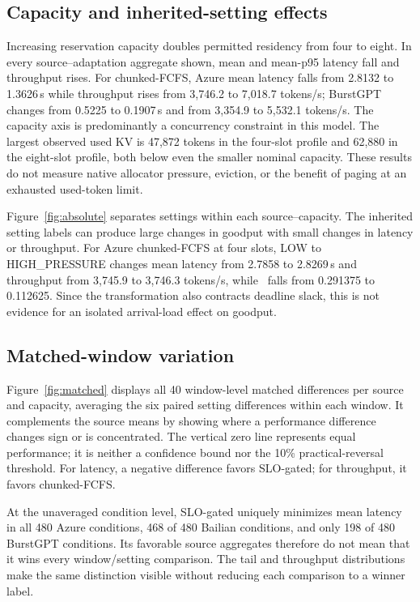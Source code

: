\FloatBarrier


\subsection{Capacity and inherited-setting effects}
Increasing reservation capacity doubles permitted residency from four to
eight. In every source--adaptation aggregate shown, mean and mean-p95 latency
fall and throughput rises. For chunked-FCFS, Azure mean latency falls from
2.8132 to 1.3626\,s while throughput rises from 3,746.2 to 7,018.7 tokens/s;
BurstGPT changes from 0.5225 to 0.1907\,s and from 3,354.9 to 5,532.1 tokens/s.
The capacity axis is predominantly a concurrency constraint in this model.
The largest observed used KV is 47,872 tokens in the four-slot profile and
62,880 in the eight-slot profile, both below even the smaller nominal
capacity. These results do not measure native allocator pressure, eviction,
or the benefit of paging at an exhausted used-token limit.

Figure~\ref{fig:absolute} separates settings within each source--capacity.
The inherited setting labels can produce large changes in goodput with
small changes in latency or throughput. For Azure chunked-FCFS at four
slots, LOW to HIGH\_PRESSURE changes mean latency from 2.7858 to 2.8269\,s
and throughput from 3,745.9 to 3,746.3 tokens/s, while \anwg\ falls from
0.291375 to 0.112625. Since the transformation also contracts deadline slack,
this is not evidence for an isolated arrival-load effect on goodput.

\subsection{Matched-window variation}
Figure~\ref{fig:matched} displays all 40 window-level matched differences
per source and capacity, averaging the six paired setting differences
within each window. It complements the source means by showing where a
performance difference changes sign or is concentrated. The vertical
zero line represents equal performance; it is neither a confidence bound
nor the 10\% practical-reversal threshold. For latency, a negative difference
favors SLO-gated; for throughput, it favors chunked-FCFS.

At the unaveraged condition level, SLO-gated uniquely minimizes mean latency
in all 480 Azure conditions, 468 of 480 Bailian conditions, and only 198 of
480 BurstGPT conditions. Its favorable source aggregates therefore do not
mean that it wins every window/setting comparison. The tail and throughput
distributions make the same distinction visible without reducing each
comparison to a winner label.

